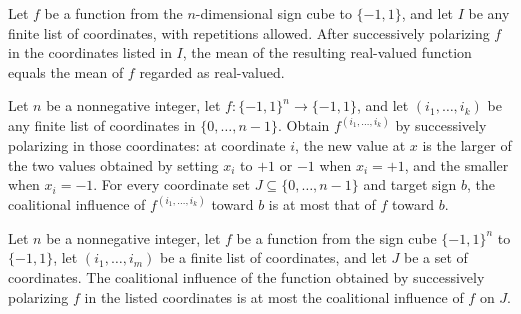 \begin{theorem}
\label{FABL.mean_polarizeCoordinates}
\leanok
{}
Let $f$ be a function from the $n$-dimensional sign cube to $\{-1,1\}$, and let $I$ be any
finite list of coordinates, with repetitions allowed. After successively polarizing $f$
in the coordinates listed in $I$, the mean of the resulting real-valued function equals
the mean of $f$ regarded as real-valued.
\end{theorem}

\begin{theorem}
\label{FABL.coalitionalInfluenceToward_polarizeCoordinates_le}
\leanok
{}
Let $n$ be a nonnegative integer, let $f:\{-1,1\}^n\to\{-1,1\}$, and let
$(i_1,\ldots,i_k)$ be any finite list of coordinates in $\{0,\ldots,n-1\}$. Obtain
$f^{(i_1,\ldots,i_k)}$ by successively polarizing in those coordinates: at coordinate
$i$, the new value at $x$ is the larger of the two values obtained by setting $x_i$ to
$+1$ or $-1$ when $x_i=+1$, and the smaller when $x_i=-1$. For every coordinate set
$J\subseteq\{0,\ldots,n-1\}$ and target sign $b$, the coalitional influence of
$f^{(i_1,\ldots,i_k)}$ toward $b$ is at most that of $f$ toward $b$.
\end{theorem}

\begin{theorem}
\label{FABL.coalitionalInfluence_polarizeCoordinates_le}
\leanok
{}
Let $n$ be a nonnegative integer, let $f$ be a function from the sign cube $\{-1,1\}^n$
to $\{-1,1\}$, let $(i_1,\ldots,i_m)$ be a finite list of coordinates, and let $J$ be a
set of coordinates. The coalitional influence of the function obtained by successively
polarizing $f$ in the listed coordinates is at most the coalitional influence of $f$ on
$J$.
\end{theorem}

